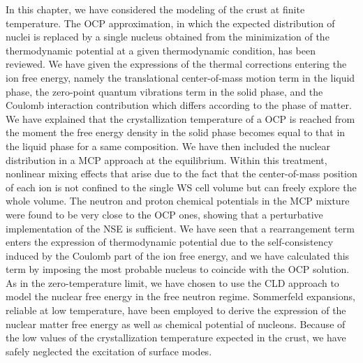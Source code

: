 In this chapter, we have considered the modeling of the crust at finite
temperature. 
The OCP approximation, in which the expected distribution of
nuclei is replaced by a single nucleus obtained from the minimization of the
thermodynamic potential at a given thermodynamic condition, has been reviewed.
We have given the expressions of the thermal corrections entering the ion 
free energy, namely the translational center-of-mass motion term in the liquid 
phase, the zero-point quantum vibrations term in the solid phase, and the 
Coulomb interaction contribution which differs according to the phase of 
matter. We have explained that the crystallization temperature of a OCP is 
reached from the moment the free energy density in the solid phase becomes 
equal to that in the liquid phase for a same composition.
We have then included the nuclear distribution in a MCP approach at the 
equilibrium. Within this treatment, nonlinear mixing effects that arise due to 
the fact that the center-of-mass position of each ion is not confined to the 
single WS cell volume but can freely explore the whole volume. 
The neutron and proton chemical potentials in the MCP mixture were found to be 
very close to the OCP ones, showing that a perturbative implementation of the 
NSE is sufficient. 
We have seen that a rearrangement term enters the expression of thermodynamic 
potential due to the self-consistency induced by the Coulomb part of the ion 
free energy, and we have calculated this term by imposing the most probable 
nucleus to coincide with the OCP solution.
As in the zero-temperature limit, we have chosen to use the CLD approach to 
model the nuclear free energy in the free neutron regime. 
Sommerfeld expansions, reliable at low temperature, have been employed to 
derive the expression of the nuclear matter free energy as well as chemical
potential of nucleons. Because of the low values of the crystallization 
temperature expected in the crust, we have safely neglected the excitation of 
surface modes.

